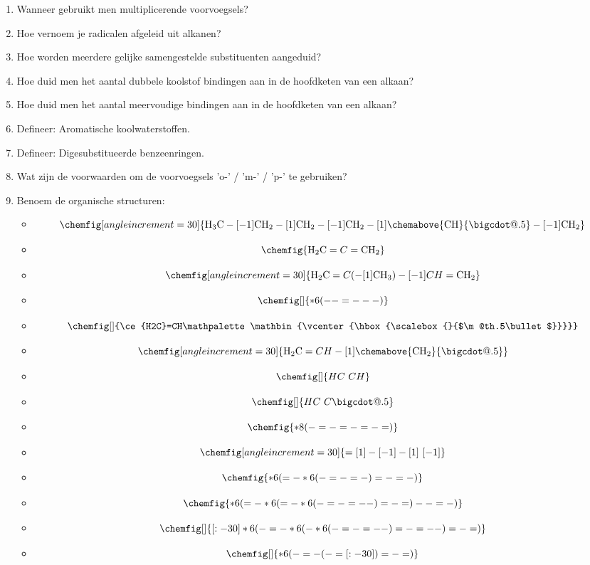 \documentclass[a4paper,12pt]{article}
\makeatletter
\newcommand*\bigcdot{\mathpalette\bigcdot@{.5}}
\newcommand*\bigcdot@[2]{\mathbin{\vcenter{\hbox{\scalebox{#2}{$\m@th#1\bullet$}}}}}
\makeatother
\begin{document}
\begin{enumerate}
        \item Wanneer gebruikt men multiplicerende voorvoegsels?
        \item Hoe vernoem je radicalen afgeleid uit alkanen?
        \item Hoe worden meerdere gelijke samengestelde substituenten aangeduid? 
        \item Hoe duid men het aantal dubbele koolstof bindingen aan in de hoofdketen van een alkaan?
        \item Hoe duid men het aantal meervoudige bindingen aan in de hoofdketen van een alkaan? 
        \item Defineer: Aromatische koolwaterstoffen. 
        \item Defineer: Digesubstitueerde benzeenringen. 
        \item Wat zijn de voorwaarden om de voorvoegsels 'o-' / 'm-' / 'p-' te gebruiken?
        \item Benoem de organische structuren:
            \begin{itemize}
                \item $$\chemfig[angle increment=30]{\ce{H3C}-[-1]\ce{CH2}-[1]\ce{CH2}-[-1]\ce{CH2}-[1]\chemabove{\ce{CH}}{\bigcdot}-[-1]\ce{CH2}}$$
                \item $$\chemfig{\ce{H2C}=C=\ce{CH2}}$$
                \item $$\chemfig[angle increment=30]{\ce{H2C}=C(-[1]\ce{CH3})-[-1]CH=\ce{CH2}}$$
                \item $$\chemfig[]{*6(--=---)}$$
                \item $$\chemfig[]{\ce{H2C}=CH\bigcdot{}}$$
                \item $$\chemfig[angle increment=30]{\ce{H2C}=CH-[1]\chemabove{\ce{CH2}}{\bigcdot}}$$
                \item $$\chemfig[]{HC~CH}$$
                \item $$\chemfig[]{HC~C\bigcdot}$$
                \item $$\chemfig{*8(-=-=-=-=)}$$
                \item $$\chemfig[angle increment=30]{=[1]-[-1]-[1]~[-1]}$$
                \item $$\chemfig{*6(=-*6(-=-=-)=-=-)}$$
                \item $$\chemfig{*6(=-*6(=-*6(-=-=--)=-=)--=-)}$$
                \item $$\chemfig[]{[:-30]*6(-=-*6(-*6(-=-=--)=-=--)=-=)}$$
                \item $$\chemfig[]{*6(-=-(-=[:-30])=-=)}$$

\end{itemize}
\end{enumerate}
\end{document}
